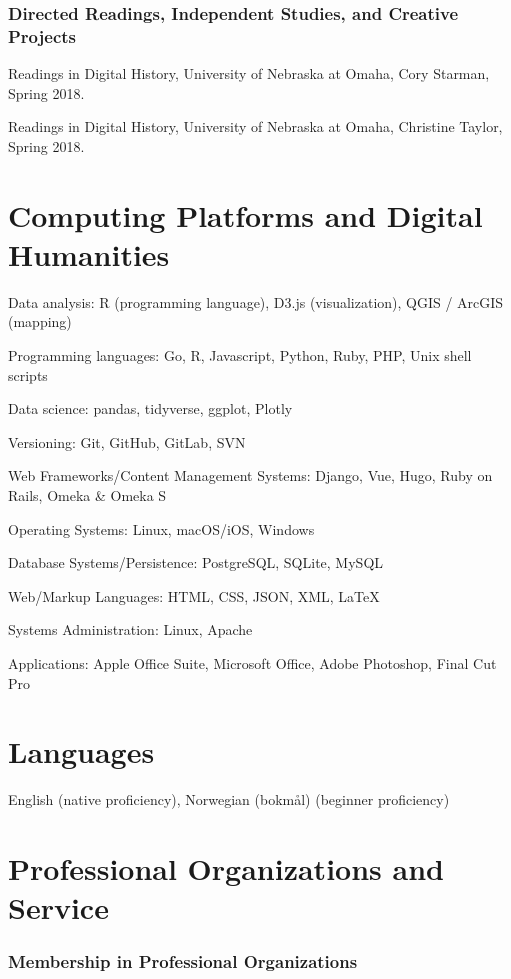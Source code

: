 \subsubsection{Directed Readings, Independent Studies, and Creative
Projects}\label{directed-readings-independent-studies-and-creative-projects}

Readings in Digital History, University of Nebraska at Omaha, Cory
Starman, Spring 2018.

Readings in Digital History, University of Nebraska at Omaha, Christine
Taylor, Spring 2018.

\section{Computing Platforms and Digital
Humanities}\label{computing-platforms-and-digital-humanities}

Data analysis: R (programming language), D3.js (visualization), QGIS /
ArcGIS (mapping)

Programming languages: Go, R, Javascript, Python, Ruby, PHP, Unix shell
scripts

Data science: pandas, tidyverse, ggplot, Plotly

Versioning: Git, GitHub, GitLab, SVN

Web Frameworks/Content Management Systems: Django, Vue, Hugo, Ruby on
Rails, Omeka \& Omeka S

Operating Systems: Linux, macOS/iOS, Windows

Database Systems/Persistence: PostgreSQL, SQLite, MySQL

Web/Markup Languages: HTML, CSS, JSON, XML, \LaTeX

Systems Administration: Linux, Apache

Applications: Apple Office Suite, Microsoft Office, Adobe Photoshop,
Final Cut Pro

\section{Languages}\label{languages}

English (native proficiency), Norwegian (bokm\r{a}l) (beginner
proficiency)

\section{Professional Organizations and
Service}\label{professional-organizations-and-service}

\subsubsection{Membership in Professional
Organizations}\label{membership-in-professional-organizations}

